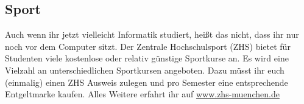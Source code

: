\subsection{Sport}
Auch wenn ihr jetzt vielleicht Informatik studiert, heißt das nicht, dass 
ihr nur noch vor dem Computer sitzt. \doublebreak
Der Zentrale Hochschulsport (ZHS) bietet für Studenten 
viele kostenlose oder relativ günstige Sportkurse an.
 Es wird eine Vielzahl an unterschiedlichen Sportkursen angeboten.
Dazu müsst ihr euch (einmalig) einen ZHS Ausweis 
zulegen und pro Semester eine entsprechende 
Entgeltmarke kaufen. \doublebreak
Alles Weitere erfahrt ihr auf \linebreak
\url{www.zhs-muenchen.de}